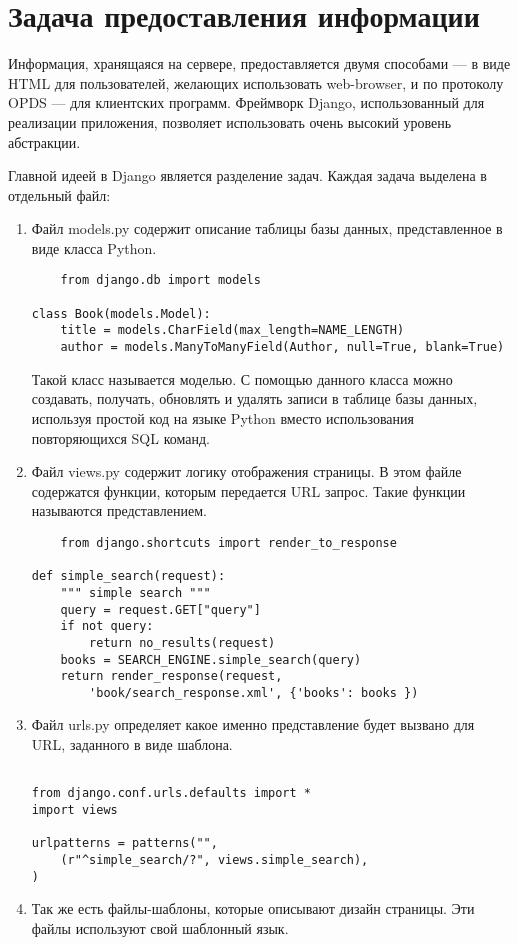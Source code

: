 \documentclass[a4paper]{report}
\begin{document}
\newpage
\section{ Задача предоставления информации}

Информация, хранящаяся на сервере, предоставляется двумя способами --- в виде HTML для пользователей, желающих использовать web-browser, и по протоколу OPDS --- для клиентских программ. Фреймворк Django, использованный для реализации приложения, позволяет использовать очень высокий уровень абстракции.

Главной идеей в Django является разделение задач. Каждая задача выделена в отдельный файл:

\begin{enumerate}
	\item Файл models.py содержит описание таблицы базы данных, представленное в виде класса Python. 

{
\small \begin{verbatim}	
	from django.db import models

class Book(models.Model):
    title = models.CharField(max_length=NAME_LENGTH)
    author = models.ManyToManyField(Author, null=True, blank=True)
\end{verbatim}	
}	
	
	Такой класс называется моделью. С помощью данного класса можно создавать, получать, обновлять и удалять записи в таблице базы данных, используя простой код на языке Python вместо использования повторяющихся SQL команд.

	\item Файл views.py содержит логику отображения страницы. В этом файле содержатся функции, которым передается URL запрос. Такие функции называются представлением.
	
{
\small \begin{verbatim}	
	from django.shortcuts import render_to_response

def simple_search(request):
    """ simple search """
    query = request.GET["query"]
    if not query:
        return no_results(request)
    books = SEARCH_ENGINE.simple_search(query)
    return render_response(request,
        'book/search_response.xml', {'books': books })
\end{verbatim}	
}

	\item Файл urls.py определяет какое именно представление будет вызвано для URL, заданного в виде шаблона. 

{
\small \begin{verbatim}	

from django.conf.urls.defaults import *
import views

urlpatterns = patterns("",
    (r"^simple_search/?", views.simple_search),
)
\end{verbatim}	
}	
	
	\item Так же есть файлы-шаблоны, которые описывают дизайн страницы. Эти файлы используют свой шаблонный язык.
\end{enumerate}
\end{document}
